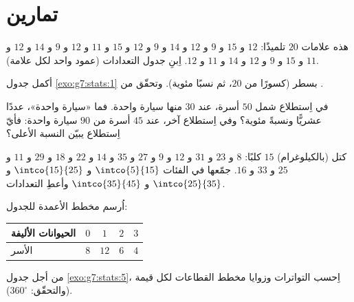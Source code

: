\section{تمارين}

\begin{exercise}[$\star$]\label{exo:g7:stats:1}
هذه علامات $20$ تلميذًا: $12$ و $15$ و $9$ و $12$ و $14$
و $9$ و $12$ و $15$ و $11$ و $12$ و $9$ و $14$ و $12$ و $11$ و $15$ و $9$ و $12$
و $14$ و $11$ و $12$. اِبنِ جدول التعدادات (عمود واحد لكل علامة).
\end{exercise}

\begin{exercise}[$\star$]\label{exo:g7:stats:2}
أكمل جدول \cref{exo:g7:stats:1} بسطر 
(كسورًا من $20$، ثم نسبًا مئوية). وتحقّق من .
\end{exercise}

\begin{exercise}[$\star$]\label{exo:g7:stats:3}
في اِستطلاع شمل $50$ أسرة، عند $30$ منها سيارة واحدة. فما
 «سيارة واحدة»، عددًا عشريًّا ونسبةً مئوية؟ وفي اِستطلاع
آخر، عند $45$ أسرة من $90$ سيارة واحدة: فأيّ اِستطلاع يبيّن
النسبة الأعلى؟
\end{exercise}

\begin{exercise}[$\star$]\label{exo:g7:stats:4}
كتل (بالكيلوغرام) $15$ كلبًا: $8$ و $23$ و $31$ و $12$ و $9$ و $27$ و $35$
و $14$ و $22$ و $18$ و $29$ و $11$ و $25$ و $33$ و $16$. جمّعها في
الفئات $\intco{5}{15}$ و $\intco{15}{25}$ و $\intco{25}{35}$
و $\intco{35}{45}$ وأعطِ التعدادات.
\end{exercise}

\begin{exercise}[$\star$]\label{exo:g7:stats:5}
اُرسم مخطط الأعمدة للجدول:
\begin{center}
\renewcommand{\arraystretch}{1.2}
\begin{tabular}{l|cccc}
الحيوانات الأليفة & $0$ & $1$ & $2$ & $3$ \\
\hline
الأسر & $8$ & $12$ & $6$ & $4$ \\
\end{tabular}
\end{center}
\end{exercise}

\begin{exercise}[$\star$]\label{exo:g7:stats:6}
من أجل جدول \cref{exo:g7:stats:5}، اِحسب التواترات
وزوايا مخطط القطاعات لكل قيمة (والتحقّق:  $360^\circ$).
\end{exercise}

